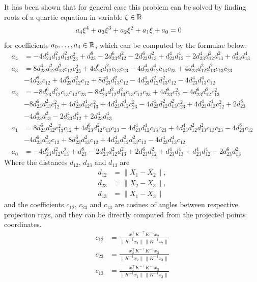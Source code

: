 It has been shown that for general case this problem can be solved by finding roots of a quartic equation in variable $\xi\in\mathbb{R}$
\begin{align}
  a_4\xi^4 + a_3\xi^3 + a_2\xi^2 + a_1\xi + a_0 &= 0\labeleq{app:P3P:4}
\end{align}
for coefficients $a_0, \ldots, a_4\in\mathbb{R}$, which can be computed by the formulae below.
\begin{align}
  a_4 &= -4d_{23}^4d_{12}^2d_{13}^2c_{23}^2+d_{23}^8-2d_{23}^6d_{12}^2-2d_{23}^6d_{13}^2+d_{23}^4d_{12}^4+2d_{23}^4d_{12}^2d_{13}^2+d_{23}^4d_{13}^4\\
  a_3 &= 8d_{23}^4d_{12}^2d_{13}^2c_{12}c_{23}^2+4d_{23}^6d_{12}^2c_{13}c_{23}-4d_{23}^4d_{12}^4c_{13}c_{23}+4d_{23}^4d_{12}^2d_{13}^2c_{13}c_{23}\\
      &-4d_{23}^8c_{12}+4d_{23}^6d_{12}^2c_{12}+8d_{23}^6d_{13}^2c_{12}-4d_{23}^4d_{12}^2d_{13}^2c_{12}-4d_{23}^4d_{13}^4c_{12}\nonumber\\
  a_2 &= -8d_{23}^6d_{12}^2c_{13}c_{12}c_{23}-8d_{23}^4d_{12}^2d_{13}^2c_{13}c_{12}c_{23}+4d_{23}^8c_{12}^2-4d_{23}^6d_{12}^2c_{13}^2\\
      &-8d_{23}^6d_{13}^2c_{12}^2+4d_{23}^4d_{12}^4c_{13}^2+4d_{23}^4d_{12}^4c_{23}^2-4d_{23}^4d_{12}^2d_{13}^2c_{23}^2+4d_{23}^4d_{13}^4c_{12}^2+2d_{23}^8\nonumber\\
      &-4d_{23}^6d_{13}^2-2d_{23}^4d_{12}^4+2d_{23}^4d_{13}^4\nonumber\\
  a_1 &= 8d_{23}^6d_{12}^2c_{13}^2c_{12}+4d_{23}^6d_{12}^2c_{13}c_{23}-4d_{23}^4d_{12}^4c_{13}c_{23}+4d_{23}^4d_{12}^2d_{13}^2c_{13}c_{23}-4d_{23}^8c_{12}\\
      &-4d_{23}^6d_{12}^2c_{12}+8d_{23}^6d_{13}^2c_{12}+4d_{23}^4d_{12}^2d_{13}^2c_{12}-4d_{23}^4d_{13}^4c_{12}\nonumber\\
  a_0 &= -4d_{23}^6d_{12}^2c_{13}^2+d_{23}^8-2d_{23}^4d_{12}^2d_{13}^2+2d_{23}^6d_{12}^2+d_{23}^4d_{13}^4+d_{23}^4d_{12}^4-2d_{23}^6d_{13}^2
\end{align}
Where the distances $d_{12}$, $d_{23}$ and $d_{13}$ are
\begin{align}
  d_{12} &= \|X_1 - X_2\|,\\
  d_{23} &= \|X_2 - X_3\|,\\
  d_{13} &= \|X_1 - X_3\|
\end{align}
and the coefficients $c_{12}$, $c_{23}$ and $c_{13}$ are cosines of angles between respective projection rays, and they can be directly computed from the projected points coordinates.
\begin{align}
  c_{12} &= \frac{x_1^\top K^{-\top} K^{-1}x_2}{\|K^{-1}x_1\|\|K^{-1}x_2\|}\\
  c_{23} &= \frac{x_2^\top K^{-\top} K^{-1}x_3}{\|K^{-1}x_2\|\|K^{-1}x_3\|}\\
  c_{13} &= \frac{x_1^\top K^{-\top} K^{-1}x_3}{\|K^{-1}x_1\|\|K^{-1}x_3\|}
\end{align}

